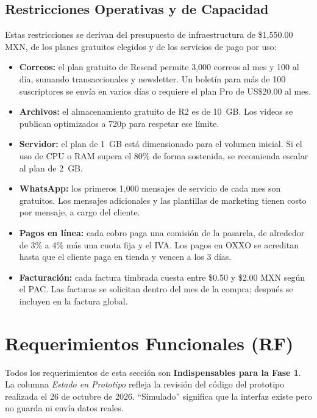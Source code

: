 \documentclass[11pt,letterpaper]{article}
\begin{document}
\subsection{Restricciones Operativas y de Capacidad}
Estas restricciones se derivan del presupuesto de infraestructura de \$1,550.00 MXN, de los planes gratuitos elegidos y de los servicios de pago por uso:
\begin{itemize}[leftmargin=1.5em]
    \item \textbf{Correos:} el plan gratuito de Resend permite 3,000 correos al mes y 100 al día, sumando transaccionales y newsletter. Un boletín para más de 100 suscriptores se envía en varios días o requiere el plan Pro de US\$20.00 al mes.
    \item \textbf{Archivos:} el almacenamiento gratuito de R2 es de 10~GB. Los videos se publican optimizados a 720p para respetar ese límite.
    \item \textbf{Servidor:} el plan de 1~GB está dimensionado para el volumen inicial. Si el uso de CPU o RAM supera el 80\% de forma sostenida, se recomienda escalar al plan de 2~GB.
    \item \textbf{WhatsApp:} los primeros 1,000 mensajes de servicio de cada mes son gratuitos. Los mensajes adicionales y las plantillas de marketing tienen costo por mensaje, a cargo del cliente.
    \item \textbf{Pagos en línea:} cada cobro paga una comisión de la pasarela, de alrededor de 3\% a 4\% más una cuota fija y el IVA. Los pagos en OXXO se acreditan hasta que el cliente paga en tienda y vencen a los 3 días.
    \item \textbf{Facturación:} cada factura timbrada cuesta entre \$0.50 y \$2.00 MXN según el PAC. Las facturas se solicitan dentro del mes de la compra; después se incluyen en la factura global.
\end{itemize}

\section{Requerimientos Funcionales (RF)}

Todos los requerimientos de esta sección son \textbf{Indispensables para la Fase 1}. La columna \textit{Estado en Prototipo} refleja la revisión del código del prototipo realizada el 26 de octubre de 2026. ``Simulado'' significa que la interfaz existe pero no guarda ni envía datos reales.
\end{document}
